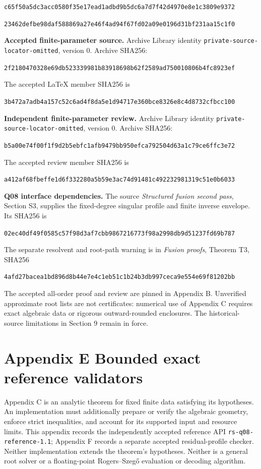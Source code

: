 \documentclass[
  11pt,
]{article}
\begin{document}
\nolinkurl{c65f50a5dc3acc0580f35e17ead1adbd9b5dc6a7d7f42d4970e8e1c3809e9372}

\nolinkurl{23462defbe98daf588869a27e46f4ad94f67fd02a09e0196d31bf231aa15c1f0}

\textbf{Accepted finite-parameter source.} Archive Library identity
\nolinkurl{private-source-locator-omitted}, version 0.
Archive SHA256:

\nolinkurl{2f2180470328e69db523339981b83918698b62f2589ad750010806b4fc8923ef}

The accepted LaTeX member SHA256 is

\nolinkurl{3b472a7adb4a157c52c6ad4f8da5e1d94717e360bce8326e8c4d8732cfbcc100}

\textbf{Independent finite-parameter review.} Archive Library identity
\nolinkurl{private-source-locator-omitted}, version 0.
Archive SHA256:

\nolinkurl{b5a00e74f00f1f9d2b5ebfc1afb9479bb950efca792504d63a1c79ce6ffc3e72}

The accepted review member SHA256 is

\nolinkurl{a412af68fbeffe1d6f332280a5b59e3ac74d91481c492232981319c51e0b6033}

\textbf{Q08 interface dependencies.} The source \emph{Structured fusion
second pass}, Section S3, supplies the fixed-degree singular profile
and finite inverse envelope. Its SHA256 is

\nolinkurl{02ec40df49f0585c57f98d3af7cbb9867216773f98a2998db9d51237fd69b787}

The separate resolvent and root-path warning is in \emph{Fusion proofs},
Theorem T3, SHA256

\nolinkurl{4afd27bacea1bd896d8b44e7e4c1eb51c1b24b3db997ceca9e554e69f81202bb}

The accepted all-order proof and review are pinned in Appendix B.
Unverified approximate root lists are not certificates: numerical use
of Appendix C requires exact algebraic data or rigorous outward-rounded
enclosures. The historical-source limitations in Section 9 remain in
force.

\clearpage
\section{Appendix E Bounded exact reference validators}
\label{appendix-e-validators}

Appendix C is an analytic theorem for fixed finite data satisfying its
hypotheses. An implementation must additionally prepare or verify the
algebraic geometry, enforce strict inequalities, and account for its
supported input and resource limits. This appendix records the independently
accepted reference API \texttt{rs-q08-reference-1.1}; Appendix F records a
separate accepted residual-profile checker. Neither implementation extends
the theorem's hypotheses. Neither is a general root solver or a
floating-point Rogers--Szegő evaluation or decoding algorithm.
\end{document}
